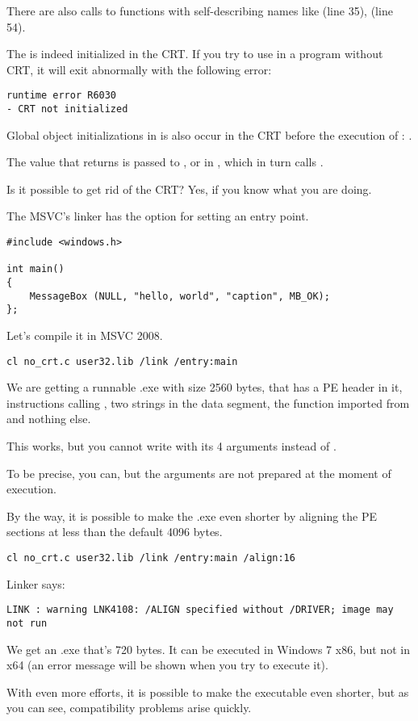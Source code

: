 There are also calls to functions
with self-describing names like  (line 35),  (line 54).

The  is indeed initialized in the \ac{CRT}.
If you try to use  in a program without CRT, it will exit abnormally with the following error:

\begin{lstlisting}
runtime error R6030
- CRT not initialized
\end{lstlisting}

Global object initializations in \Cpp is also occur in the \ac{CRT} before the execution of \main{}: 
.

The value that \main{} returns is passed to , 
or in , which in turn calls .

Is it possible to get rid of the \ac{CRT}?
Yes, if you know what you are doing.

The \ac{MSVC}'s linker has the  option for setting an entry point.

\begin{lstlisting}[style=customc]
#include <windows.h>

int main()
{
	MessageBox (NULL, "hello, world", "caption", MB_OK);
};
\end{lstlisting}

Let's compile it in MSVC 2008.

\begin{lstlisting}
cl no_crt.c user32.lib /link /entry:main
\end{lstlisting}

We are getting a runnable .exe with size 2560 bytes, that has a PE header in it, instructions calling
, two strings in the data segment,
the  function imported from  and nothing else.

This works, but you cannot write  with its 4 arguments instead of \main{}.

To be precise, you can, but the arguments are not prepared at the moment of execution.

By the way, it is possible to make the .exe even 
shorter by aligning the \ac{PE} sections at less than the default 4096 bytes.

\begin{lstlisting}
cl no_crt.c user32.lib /link /entry:main /align:16
\end{lstlisting}

Linker says:

\begin{lstlisting}
LINK : warning LNK4108: /ALIGN specified without /DRIVER; image may not run
\end{lstlisting}

We get an .exe that's 720 bytes.
It can be executed in Windows 7 x86, but not in x64 
(an error message will be shown when you try to execute it).

With even more efforts, it is possible
to make the executable even shorter, but as you can see, compatibility problems arise quickly.

